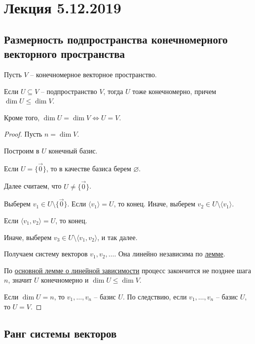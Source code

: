 \section{Лекция 5.12.2019}


\subsection{Размерность подпространства конечномерного векторного пространства}

Пусть $V$ -- конечномерное векторное пространство.

\begin{proposal}
    Если $U \subseteq V$ -- подпространство $V$, тогда $U$ тоже конечномерно, причем $\dim U \leq \dim V$. 

    Кроме того, $\dim U = \dim V \iff U = V$.
\end{proposal}

\begin{proof}
    Пусть $n = \dim V$.

    Построим в $U$ конечный базис.

    Если $U = \{\overrightarrow{0}\}$, то в качестве базиса берем $\varnothing$.

    Далее считаем, что $U \neq \{\overrightarrow{0}\}$. 

    Выберем $v_1 \in U \setminus \{\overrightarrow{0}\}$. Если $\langle v_1 \rangle = U$, то конец. Иначе, выберем $v_2 \in U \setminus \langle v_1 \rangle$.

    Если $\langle v_1, v_2 \rangle = U$, то конец.

    Иначе, выберем $v_3 \in U \setminus \langle v_1, v_2 \rangle$, и так далее.

    Получаем систему векторов $v_1, v_2, \dots$. Она линейно независима по \hyperref[lec12:lemma]{лемме}.

    \bigskip
    По \hyperref[lec11:osnovnaya_lemma_o_lin_zavisimosti]{основной лемме о линейной зависимости} процесс закончится не позднее шага $n$, значит $U$ конечномерно и $\dim U \leq \dim V$.

    Если $\dim U = n$, то $v_1, \dots, v_n$ -- базис $U$. 
    По следствию, если $v_1, \dots, v_n$ -- базис $U$, то $U = V$.
\end{proof}


\subsection{Ранг системы векторов}


